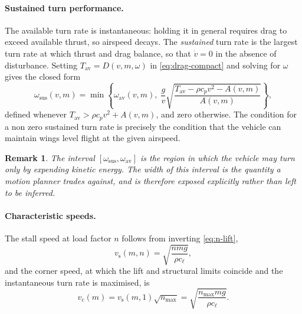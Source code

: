 \documentclass[11pt,a4paper]{article}
\newtheorem{remark}{Remark}
\begin{document}
\paragraph{Sustained turn performance.}
The available turn rate is instantaneous: holding it in general requires drag to
exceed available thrust, so airspeed decays. The \emph{sustained} turn rate is
the largest turn rate at which thrust and drag balance, so that $\dot v = 0$ in
the absence of disturbance. Setting $T_{\mathrm{av}} = D(v, m, \omega)$ in
\cref{eq:drag-compact} and solving for $\omega$ gives the closed form
\begin{equation}
  \omega_{\mathrm{sus}}(v, m) =
  \min\left\{
    \omega_{\mathrm{av}}(v,m),\;
    \frac{g}{v}
    \sqrt{\frac{T_{\mathrm{av}} - \rho c_p v^{2} - A(v,m)}{A(v,m)}}
  \right\},
  \label{eq:omega-sustained}
\end{equation}
defined whenever $T_{\mathrm{av}} > \rho c_p v^{2} + A(v,m)$, and zero otherwise.
The condition for a non zero sustained turn rate is precisely the condition that
the vehicle can maintain wings level flight at the given airspeed.

\begin{remark}
The interval $[\omega_{\mathrm{sus}}, \omega_{\mathrm{av}}]$ is the region in
which the vehicle may turn only by expending kinetic energy. The width of this
interval is the quantity a motion planner trades against, and is therefore
exposed explicitly rather than left to be inferred.
\end{remark}

\paragraph{Characteristic speeds.}
The stall speed at load factor $n$ follows from inverting \cref{eq:n-lift},
\begin{equation}
  v_{\mathrm{s}}(m, n) = \sqrt{\frac{n m g}{\rho c_\ell}},
  \label{eq:v-stall}
\end{equation}
and the corner speed, at which the lift and structural limits coincide and the
instantaneous turn rate is maximised, is
\begin{equation}
  v_{\mathrm{c}}(m) = v_{\mathrm{s}}(m, 1)\sqrt{n_{\max}}
  = \sqrt{\frac{n_{\max} m g}{\rho c_\ell}} .
  \label{eq:v-corner}
\end{equation}
\end{document}

